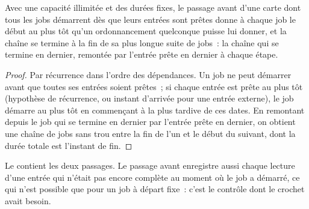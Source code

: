 \begin{proposition}\label{prop:pl:the-platform-map:earliest}
Avec une capacité illimitée et des durées fixes, le passage avant d'une carte dont tous les jobs démarrent dès que leurs entrées sont prêtes donne à chaque job le
début au plus tôt qu'un ordonnancement quelconque puisse lui donner, et la chaîne se termine à la fin de sa plus longue suite de jobs~: la chaîne qui se termine en dernier,
remontée par l'entrée prête en dernier à chaque étape.
\end{proposition}

\begin{proof}
Par récurrence dans l'ordre des dépendances. Un job ne peut démarrer avant que toutes ses entrées soient prêtes~; si chaque entrée est prête au plus tôt
(hypothèse de récurrence, ou instant d'arrivée pour une entrée externe), le job démarre au plus tôt
en commençant à la plus tardive de ces dates. En remontant depuis le job qui se termine en dernier par l'entrée prête en dernier, on obtient une chaîne de jobs
sans trou entre la fin de l'un et le début du suivant, dont la durée totale est l'instant de fin.
\end{proof}

Le  contient les deux passages. Le passage avant enregistre aussi chaque lecture d'une entrée qui n'était pas encore
complète au moment où le job a démarré, ce qui n'est possible que pour un job à départ fixe~: c'est le contrôle dont le crochet avait besoin.

\label{lst:pl:the-platform-map:passes}

